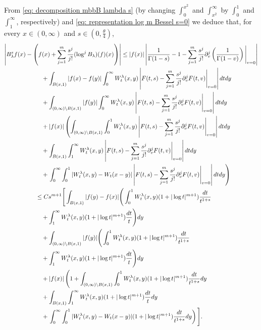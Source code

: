 \documentclass[a4paper,10pt, reqno]{amsart}
\theoremstyle{definition}
\theoremstyle{remark}
\numberwithin{equation}{section}
\begin{document}
From \eqref{eq: decomposition mbbB lambda s} (by changing $\int_0^{x^2}$ and $\int_{x^2}^\infty$ by $\int_0^1$ and $\int_1^\infty$, respectively) and \eqref{eq: representation log m Bessel s=0} we deduce that, for every $x\in (0,\infty)$ and $s\in (0,\tfrac{\theta}{4})$,
\begin{align}\label{eq: estimate limit Blambda s positive}
\left|B_\lambda^sf(x)-\left(f(x)+\sum_{j=1}^m\frac{s^j}{j!}(\log^jB_\lambda)(f)(x)\right)\right|&\leq |f(x)|\left|\frac{1}{\Gamma (1-s)}-1-\sum_{j=1}^m\frac{s^j}{j!}\partial_v^{j}\left(\frac{1}{\Gamma (1-v)}\right)\Bigg|_{v=0}\right|\nonumber\\
&\hspace{-5cm}\quad +\int_{B(x,1)}|f(x)-f(y)|\int_0^\infty W_t^\lambda (x,y)\left|F(t,s)-\sum_{j=1}^m\frac{s^j}{j!}\partial_v^jF(t,v)\Bigg|_{v=0}\right|dtdy\nonumber\\
&\hspace{-5cm}\quad +\int_{(0,\infty)\setminus B(x,1)}|f(y)|\int_0^\infty W_t^\lambda (x,y)\left|F(t,s)-\sum_{j=1}^m\frac{s^j}{j!}\partial_v^jF(t,v)\Bigg|_{v=0}\right|dtdy\nonumber\\
&\hspace{-5cm}\quad +|f(x)|\left(\int_{(0,\infty)\setminus B(x,1)}\int_0^1 W_t^\lambda (x,y)\left|F(t,s)-\sum_{j=1}^m\frac{s^j}{j!}\partial_v^jF(t,v)\Bigg|_{v=0}\right|dtdy\right.\nonumber\\
&\hspace{-5cm}\quad +\int_{B(x,1)}\int_1^\infty W_t^\lambda (x,y)\left|F(t,s)-\sum_{j=1}^m\frac{s^j}{j!}\partial_v^jF(t,v)\Bigg|_{v=0}\right|dtdy\nonumber\\
&\hspace{-5cm}\quad +\left.\int_0^\infty\int_0^1|W_t^\lambda (x,y)-W_t(x-y)|\left|F(t,s)-\sum_{j=1}^m\frac{s^j}{j!}\partial_v^jF(t,v)\Bigg|_{v=0}\right|dtdy\right)\nonumber\\
&\hspace{-5cm} \leq Cs^{m+1}\Bigg[\int_{B(x,1)}|f(y)-f(x)|\Bigg(\int_0^1W_t^\lambda (x,y)(1+|\log t|^{m+1})\frac{dt}{t^{1+s}}\nonumber\\
&\hspace{-5cm}\quad +\int_1^\infty W_t^\lambda (x,y)(1+|\log t|^{m+1})\frac{dt}{t}\Bigg)dy\nonumber\\
&\hspace{-5cm} \quad +\int_{(0,\infty)\setminus B(x,1)}|f(y)|\Bigg(\int_0^1W_t^\lambda (x,y)(1+|\log t|^{m+1})\frac{dt}{t^{1+s}}\nonumber\\
&\hspace{-5cm}\quad +\int_1^\infty W_t^\lambda (x,y)(1+|\log t|^{m+1})\frac{dt}{t}\Bigg)dy\nonumber\\
&\hspace{-5cm}\quad +|f(x)|\left(1+\int_{(0,\infty)\setminus B(x,1)}\int_0^1 W_t^\lambda (x,y)(1+|\log t|^{m+1})\frac{dt}{t^{1+s}}dy\right.\nonumber\\
&\hspace{-5cm}\quad +\int_{B(x,1)}\int_1^\infty W_t^\lambda (x,y)(1+|\log t|^{m+1})\frac{dt}{t}dy\nonumber\\
&\hspace{-5cm}\quad +\left.\int_0^\infty\int_0^1|W_t^\lambda (x,y)-W_t(x-y)|(1+|\log t|^{m+1})\frac{dt}{t^{1+s}}dy\right)\Bigg].
\end{align}
\end{document}

